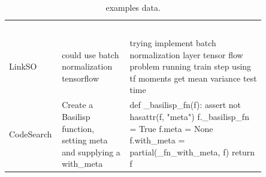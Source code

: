 \begin{table}[ht!]
\begin{tabular}{p{0.1\linewidth}  p{0.25\linewidth}  p{0.5\linewidth}}
&&\\
&&\\
&&\\
&&\\
&&\\\hline
\multirow{3}{*}{LinkSO} & \multirow{3}{\linewidth}{could use batch normalization tensorflow} & \multirow{3}{\linewidth}{ trying implement batch normalization layer tensor flow problem running train step using tf moments get mean variance test time} \\
&&\\
&&\\\hline
\multirow{4}{*}{CodeSearch} & \multirow{4}{\linewidth}{Create a Basilisp function, setting meta and supplying a with\_meta} & \multirow{4}{\linewidth}{
def \_basilisp\_fn(f): assert not hasattr(f, "meta")  f.\_basilisp\_fn = True f.meta = None f.with\_meta = partial(\_fn\_with\_meta, f)    return f }
\\
& & \\
& & \\
& & \\
\bottomrule
\end{tabular}
\caption{\task examples data. 
}
\label{tab:cross_task_eval_examples}
\end{table}


